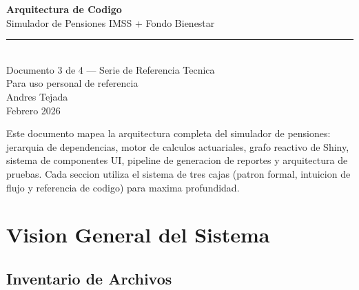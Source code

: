 \documentclass[11pt, letterpaper, twoside]{report}
\begin{document}

\begin{titlepage}
\begin{center}
\vspace*{3cm}

{\Huge\bfseries\color{tealdark} Arquitectura de Codigo}\\[0.5cm]
{\LARGE\color{teal} Simulador de Pensiones IMSS + Fondo Bienestar}\\[1.5cm]

\rule{0.8\textwidth}{1pt}\\[1cm]

{\large Documento 3 de 4 --- Serie de Referencia Tecnica}\\[0.5cm]
{\large\color{goldmuted} Para uso personal de referencia}\\[2cm]

{\Large Andres Tejada}\\[0.3cm]
{\color{goldmuted} Febrero 2026}\\[3cm]

\begin{minipage}{0.7\textwidth}
\centering\small\color{textmain}
Este documento mapea la arquitectura completa del simulador de pensiones:
jerarquia de dependencias, motor de calculos actuariales, grafo reactivo de Shiny,
sistema de componentes UI, pipeline de generacion de reportes y arquitectura de pruebas.
Cada seccion utiliza el sistema de tres cajas (patron formal, intuicion de flujo
y referencia de codigo) para maxima profundidad.
\end{minipage}

\end{center}
\end{titlepage}

\tableofcontents
\newpage


\chapter{Vision General del Sistema}
\label{ch:vision}

\section{Inventario de Archivos}
\label{sec:inventario}
\end{document}
